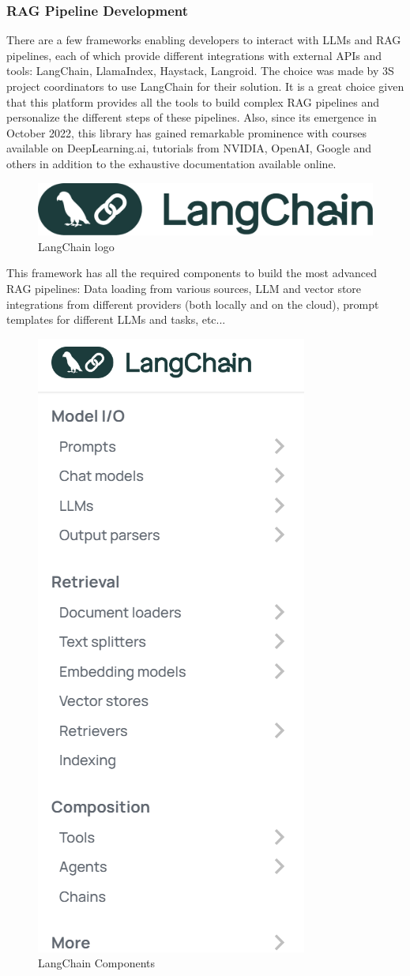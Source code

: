 \subsubsection*{RAG Pipeline Development}
There are a few frameworks enabling developers to interact with LLMs and RAG pipelines, each of which provide different integrations with external APIs and tools: LangChain, LlamaIndex, Haystack, Langroid.\newline
The choice was made by 3S project coordinators to use LangChain for their solution. It is a great choice given that this platform provides all the tools to build complex RAG pipelines and personalize the different steps of these pipelines. Also, since its emergence in October 2022, this library has gained remarkable prominence with courses available on DeepLearning.ai, tutorials from NVIDIA, OpenAI, Google and others in addition to the exhaustive documentation available online.
\begin{figure}[H]
    \centering
    \includegraphics[width=.5\linewidth]{./figures/langchain-logo.png}
    \caption{LangChain logo}
\end{figure}
This framework has all the required components to build the most advanced RAG pipelines: Data loading from various sources, LLM and vector store integrations from different providers (both locally and on the cloud), prompt templates for different LLMs and tasks, etc...
\begin{figure}[H]
    \centering
    \includegraphics[width=.45\linewidth]{./figures/langchain-components.png}
    \caption{LangChain Components \cite{langchainmodules}}
\end{figure}
